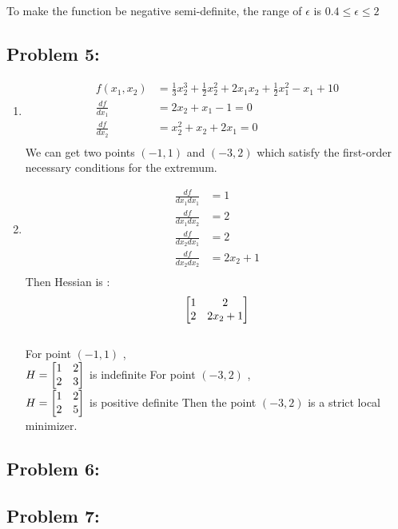 \documentclass{article}
\begin{document}
To make the function be negative semi-definite, the range of $\epsilon$ is $ 0.4 \leq \epsilon \leq 2 $ 

\subsection*{Problem 5: } 
\begin{enumerate} 
\item
\begin{align*}
f(x_1, x_2) & = \frac{1}{3}x_2^3 + \frac{1}{2}x_2^2 + 2x_1x_2 + \frac{1}{2}x_1^2-x_1+10 \\
\frac{df}{dx_1} &= 2x_2 + x_1 -1 = 0 \\
\frac{df}{dx_2} &= x_2^2 +x_2 + 2x_1 = 0 \\
\end{align*} 
We can get two points $(-1, 1)$ and $(-3, 2)$ which satisfy the first-order necessary conditions for the extremum. \\
\item 
\begin{align*} 
\frac{df}{dx_1dx_1} &= 1 \\
\frac{df}{dx_1dx_2} &=  2 \\
\frac{df}{dx_2dx_1} &= 2 \\
\frac{df}{dx_2dx_2} &= 2x_2 + 1 \\
\end{align*}
Then Hessian is : \begin{align*} \begin{bmatrix} 1 & 2 \\ 2 & 2x_2 + 1 \end{bmatrix} \end{align*} \\
For point $(-1, 1)$ , \\
$H = \begin{bmatrix} 1 & 2 \\ 2 & 3 \end{bmatrix} $  is indefinite
For point $(-3, 2) $ , \\
$H = \begin{bmatrix} 1 & 2 \\ 2 & 5 \end{bmatrix} $ is positive definite
Then the point $(-3, 2)$ is a strict local minimizer. 

\end{enumerate} 

\subsection*{Problem 6: } 



\subsection*{Problem 7: } 
\end{document}
